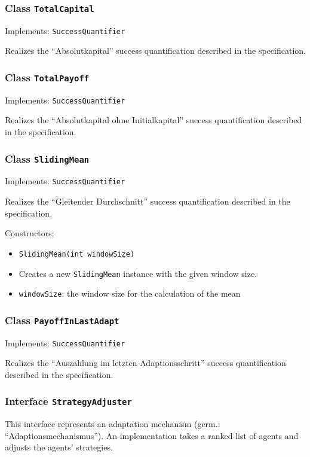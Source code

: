 \documentclass[parskip=full,11pt]{scrartcl}
\begin{document}
\subsubsection{Class \texttt{TotalCapital}}
Implements: \texttt{SuccessQuantifier}

Realizes the \enquote{Absolutkapital} success quantification described in the specification.

\subsubsection{Class \texttt{TotalPayoff}}
Implements: \texttt{SuccessQuantifier}

Realizes the \enquote{Absolutkapital ohne Initialkapital} success quantification described in the specification.

\subsubsection{Class \texttt{SlidingMean}}
Implements: \texttt{SuccessQuantifier}

Realizes the \enquote{Gleitender Durchschnitt} success quantification described in the specification.

Constructors:
\begin{itemize}\itemsep -10pt
\item \texttt{SlidingMean(int windowSize)}
\item[] Creates a new \texttt{SlidingMean} instance with the given window size.
\item[] \texttt{windowSize}: the window size for the calculation of the mean
\end{itemize}

\subsubsection{Class \texttt{PayoffInLastAdapt}}
Implements: \texttt{SuccessQuantifier}

Realizes the \enquote{Auszahlung im letzten Adaptionsschritt} success quantification described in the specification.

\subsubsection{Interface \texttt{StrategyAdjuster}}
This interface represents an adaptation mechanism (germ.: \enquote{Adaptionsmechanismus}). An implementation takes a ranked list of agents and adjusts the agents' strategies.
\end{document}

